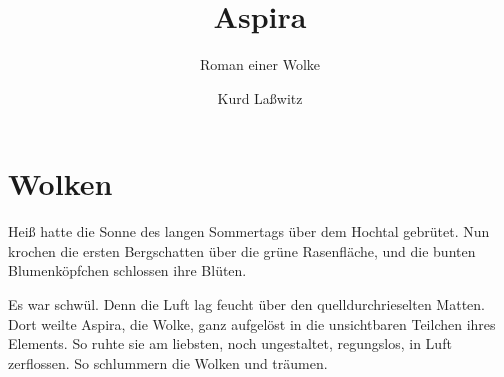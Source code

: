 \usepackage[german,ngerman]{babel}
\usepackage[T1]{fontenc}



\newcommand\rejoined{}



\newcommand*\ausaspirastagebuch{\newline\normalsize\normalfont (Aus Aspiras Tagebuch)}
\newcommand*\verseindent\hfill
\newenvironment{liebesgedicht}%
  {\setlength{\leftmargini}{0pt}\begin{verse}}%
  {\par \smallskip \nopagebreak \centering\textsf{<3}\end{verse} \smallskip}




\raggedbottom

\author{Kurd Laßwitz}
\title{Aspira}
\subtitle{Roman einer Wolke}
\date{}
\maketitle

\section{Wolken}

Heiß hatte die Sonne des langen Sommertags über dem Hochtal
gebrütet. Nun krochen die ersten Bergschatten über die grüne
Rasenfläche, und die bunten Blumenköpfchen schlossen ihre Blüten.

Es war schwül. Denn die Luft lag feucht über den
quelldurchrieselten Matten. Dort weilte Aspira, die Wolke, ganz
aufgelöst in die unsichtbaren Teilchen ihres Elements. So ruhte sie
am liebsten, noch ungestaltet, regungslos, in Luft zerflossen. So
schlummern die Wolken und träumen.


